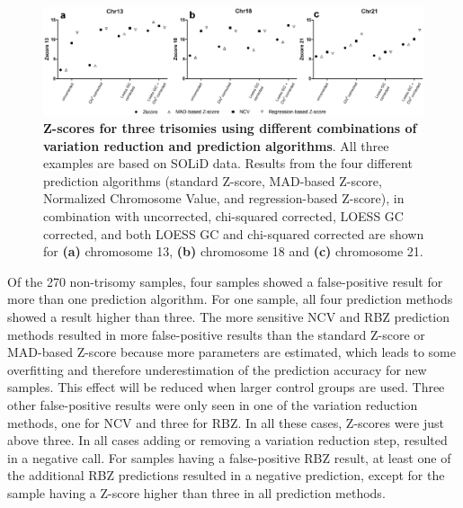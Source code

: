 \begin{figure}
	\includegraphics[width=1.0\linewidth]{img/Algorithms_NIPT_Fig6}
	\caption[Z-scores for three trisomies]{\textbf{Z-scores for three trisomies using different combinations of variation reduction and prediction algorithms}. All three examples are based on SOLiD data. Results from the four different prediction algorithms (standard Z-score, MAD-based Z-score, Normalized Chromosome Value, and regression-based Z-score), in combination with uncorrected, chi-squared corrected, LOESS GC corrected, and both LOESS GC and chi-squared corrected are shown for \textbf{(a)} chromosome 13, \textbf{(b)} chromosome 18 and \textbf{(c)} chromosome 21.}
	\label{fig:Algorithms_NIPT_Fig6}
\end{figure}

Of the 270 non-trisomy samples, four samples showed a false-positive result for more than one prediction algorithm. 
For one sample, all four prediction methods showed a result higher than three. The more sensitive NCV and RBZ prediction methods resulted in more false-positive results than the standard Z-score or MAD-based Z-score because more parameters are estimated, which leads to some overfitting and therefore underestimation of the prediction accuracy for new samples. 
This effect will be reduced when larger control groups are used. 
Three other false-positive results were only seen in one of the variation reduction methods, one for NCV and three for RBZ. In all these cases, Z-scores were just above three. 
In all cases adding or removing a variation reduction step, resulted in a negative call. 
For samples having a false-positive RBZ result, at least one of the additional RBZ predictions resulted in a negative prediction, except for the sample having a Z-score higher than three in all prediction methods.

